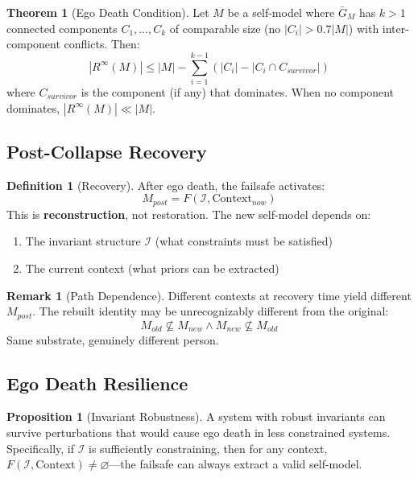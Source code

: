 \documentclass[12pt,a4paper]{article}
\theoremstyle{definition}
\newtheorem{definition}{Definition}[section]
\newtheorem{theorem}{Theorem}[section]
\newtheorem{proposition}{Proposition}[section]
\newtheorem{remark}{Remark}[section]
\begin{document}
\begin{theorem}[Ego Death Condition]
Let $M$ be a self-model where $\bar{G}_M$ has $k > 1$ connected components $C_1, \ldots, C_k$ of comparable size (no $|C_i| > 0.7 |M|$) with inter-component conflicts. Then:
\[ |R^{\infty}(M)| \leq |M| - \sum_{i=1}^{k-1} (|C_i| - |C_i \cap C_{survivor}|) \]
where $C_{survivor}$ is the component (if any) that dominates. When no component dominates, $|R^{\infty}(M)| \ll |M|$.
\end{theorem}

\subsection{Post-Collapse Recovery}

\begin{definition}[Recovery]
After ego death, the failsafe activates:
\[ M_{post} = F(\mathcal{I}, \text{Context}_{now}) \]
This is \textbf{reconstruction}, not restoration. The new self-model depends on:
\begin{enumerate}
    \item The invariant structure $\mathcal{I}$ (what constraints must be satisfied)
    \item The current context (what priors can be extracted)
\end{enumerate}
\end{definition}

\begin{remark}[Path Dependence]
Different contexts at recovery time yield different $M_{post}$. The rebuilt identity may be unrecognizably different from the original:
\[ M_{old} \not\subseteq M_{new} \land M_{new} \not\subseteq M_{old} \]
Same substrate, genuinely different person.
\end{remark}

\subsection{Ego Death Resilience}

\begin{proposition}[Invariant Robustness]
A system with robust invariants can survive perturbations that would cause ego death in less constrained systems. Specifically, if $\mathcal{I}$ is sufficiently constraining, then for any context, $F(\mathcal{I}, \text{Context}) \neq \varnothing$---the failsafe can always extract a valid self-model.
\end{proposition}
\end{document}
